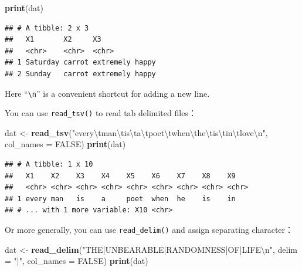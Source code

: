\documentclass[12pt,]{krantz}
\makeatletter
\newenvironment{Shaded}{\begin{snugshade}}{\end{snugshade}}
\newcommand{\CharTok}[1]{\textcolor[rgb]{0.5,0.5,0.5}{#1}}
\newcommand{\DataTypeTok}[1]{\textcolor[rgb]{0.27,0.27,0.27}{#1}}
\newcommand{\KeywordTok}[1]{\textcolor[rgb]{0.27,0.27,0.27}{\textbf{#1}}}
\newcommand{\NormalTok}[1]{#1}
\newcommand{\OtherTok}[1]{\textcolor[rgb]{0.37,0.37,0.37}{#1}}
\newcommand{\StringTok}[1]{\textcolor[rgb]{0.5,0.5,0.5}{#1}}
\newenvironment{kframe}{%
\medskip{}
\setlength{\fboxsep}{.8em}
 \def\at@end@of@kframe{}%
 \ifinner\ifhmode%
  \def\at@end@of@kframe{\end{minipage}}%
  \begin{minipage}{\columnwidth}%
 \fi\fi%
 \def\FrameCommand##1{\hskip\@totalleftmargin \hskip-\fboxsep
 \colorbox{shadecolor}{##1}\hskip-\fboxsep
     \hskip-\linewidth \hskip-\@totalleftmargin \hskip\columnwidth}%
 \MakeFramed {\advance\hsize-\width
   \@totalleftmargin\z@ \linewidth\hsize
   \@setminipage}}%
 {\par\unskip\endMakeFramed%
 \at@end@of@kframe}
\renewenvironment{Shaded}{\begin{kframe}}{\end{kframe}}
\makeatother
\begin{document}
\begin{Shaded}
\begin{Highlighting}[]
\KeywordTok{print}\NormalTok{(dat)}
\end{Highlighting}
\end{Shaded}

\begin{verbatim}
## # A tibble: 2 x 3
##   X1       X2     X3             
##   <chr>    <chr>  <chr>          
## 1 Saturday carrot extremely happy
## 2 Sunday   carrot extremely happy
\end{verbatim}

Here ``\texttt{\textbackslash{}n}'' is a convenient shortcut for adding a new line.

You can use \texttt{read\_tsv()} to read tab delimited files：

\begin{Shaded}
\begin{Highlighting}[]
\NormalTok{dat <-}\StringTok{ }\KeywordTok{read_tsv}\NormalTok{(}\StringTok{"every}\CharTok{\textbackslash{}t}\StringTok{man}\CharTok{\textbackslash{}t}\StringTok{is}\CharTok{\textbackslash{}t}\StringTok{a}\CharTok{\textbackslash{}t}\StringTok{poet}\CharTok{\textbackslash{}t}\StringTok{when}\CharTok{\textbackslash{}t}\StringTok{he}\CharTok{\textbackslash{}t}\StringTok{is}\CharTok{\textbackslash{}t}\StringTok{in}\CharTok{\textbackslash{}t}\StringTok{love}\CharTok{\textbackslash{}n}\StringTok{"}\NormalTok{, }
    \DataTypeTok{col_names =} \OtherTok{FALSE}\NormalTok{)}
\KeywordTok{print}\NormalTok{(dat)}
\end{Highlighting}
\end{Shaded}

\begin{verbatim}
## # A tibble: 1 x 10
##   X1    X2    X3    X4    X5    X6    X7    X8    X9   
##   <chr> <chr> <chr> <chr> <chr> <chr> <chr> <chr> <chr>
## 1 every man   is    a     poet  when  he    is    in   
## # ... with 1 more variable: X10 <chr>
\end{verbatim}

Or more generally, you can use \texttt{read\_delim()} and assign separating character：

\begin{Shaded}
\begin{Highlighting}[]
\NormalTok{dat <-}\StringTok{ }\KeywordTok{read_delim}\NormalTok{(}\StringTok{"THE|UNBEARABLE|RANDOMNESS|OF|LIFE}\CharTok{\textbackslash{}n}\StringTok{"}\NormalTok{, }
    \DataTypeTok{delim =} \StringTok{"|"}\NormalTok{, }\DataTypeTok{col_names =} \OtherTok{FALSE}\NormalTok{)}
\KeywordTok{print}\NormalTok{(dat)}
\end{Highlighting}
\end{Shaded}
\end{document}
